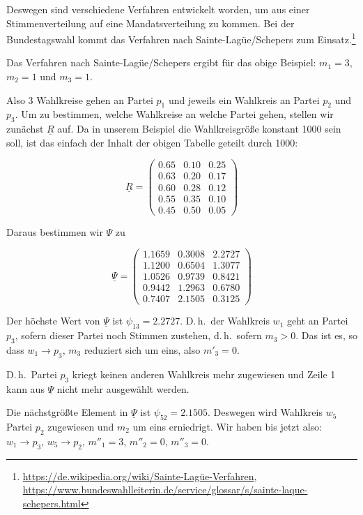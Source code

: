 Deswegen sind verschiedene Verfahren entwickelt worden, um aus einer Stimmenverteilung auf eine
Mandatsverteilung zu kommen. Bei der Bundestagswahl kommt das Verfahren nach Sainte-Lagüe/Schepers
zum Einsatz.\footnote{\url{https://de.wikipedia.org/wiki/Sainte-Lagüe-Verfahren},
\url{https://www.bundeswahlleiterin.de/service/glossar/s/sainte-laque-schepers.html}}

Das Verfahren nach Sainte-Lagüe/Schepers ergibt für das obige Beispiel:
$m_1 = 3$, $m_2 = 1$ und $m_3 = 1$.

Also 3 Wahlkreise gehen an Partei $p_1$ und jeweils ein Wahlkreis an Partei $p_2$ und $p_3$. Um
zu bestimmen, welche Wahlkreise an welche Partei gehen, stellen wir zunächst $\underline{R}$ auf.
Da in unserem Beispiel die Wahlkreisgröße konstant 1000 sein soll, ist das einfach der Inhalt
der obigen Tabelle geteilt durch 1000:

\[
  \underline{R} = \begin{pmatrix}
    0.65 & 0.10 & 0.25 \\
    0.63 & 0.20 & 0.17 \\
    0.60 & 0.28 & 0.12 \\
    0.55 & 0.35 & 0.10 \\
    0.45 & 0.50 & 0.05
  \end{pmatrix}
\]

Daraus bestimmen wir $\Psi$ zu

\[
  \underline{\Psi} = \begin{pmatrix}
    1.1659 & 0.3008 & 2.2727 \\
    1.1200 & 0.6504 & 1.3077 \\
    1.0526 & 0.9739 & 0.8421 \\
    0.9442 & 1.2963 & 0.6780 \\
    0.7407 & 2.1505 & 0.3125
  \end{pmatrix}
\]

Der höchste Wert von $\underline{\Psi}$ ist $\psi_{13} = 2.2727$. D.\,h.\ der Wahlkreis $w_1$
geht an Partei $p_3$, sofern dieser Partei noch Stimmen zustehen, d.\,h.\ sofern $m_3 > 0$. Das
ist es, so dass $w_1 \longrightarrow p_3$, $m_3$ reduziert sich um eins, also $m'_3 = 0$.

D.\,h.\ Partei $p_3$ kriegt keinen anderen Wahlkreis mehr zugewiesen und Zeile 1 kann aus
$\underline{\Psi}$ nicht mehr ausgewählt werden.

Die nächstgrößte Element in $\underline{\Psi}$ ist $\psi_{52} = 2.1505$. Deswegen wird Wahlkreis
$w_5$ Partei $p_2$ zugewiesen und $m_2$ um eins erniedrigt. Wir haben bis jetzt also:
$w_1 \longrightarrow p_3$, $w_5 \longrightarrow p_2$, $m''_1 = 3$, $m''_2 = 0$, $m''_3 = 0$.

